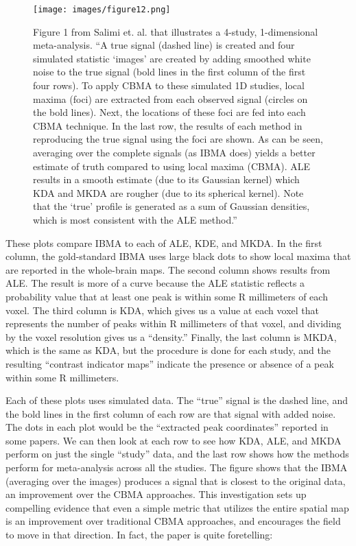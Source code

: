 \documentclass{report}
\begin{document}
\begin{figure}[h!]
\begin{center}
\texttt{[image: images/figure12.png]}
\end{center}
 \caption{\label{fig:12} Figure 1 from Salimi et. al. that illustrates a 4-study,
1-dimensional meta-analysis. ``A true signal (dashed line) is created
and four simulated statistic `images' are created by adding smoothed
white noise to the true signal (bold lines in the first column of the
first four rows). To apply CBMA to these simulated 1D studies, local
maxima (foci) are extracted from each observed signal (circles on the
bold lines). Next, the locations of these foci are fed into each CBMA
technique. In the last row, the results of each method in reproducing
the true signal using the foci are shown. As can be seen, averaging over
the complete signals (as IBMA does) yields a better estimate of truth
compared to using local maxima (CBMA). ALE results in a smooth estimate
(due to its Gaussian kernel) which KDA and MKDA are rougher (due to its
spherical kernel). Note that the `true' profile is generated as a sum of
Gaussian densities, which is most consistent with the ALE method.''}
\end{figure}

These plots \cite{Salimi-Khorshidi2009-if} compare
IBMA to each of ALE, KDE, and MKDA. In the first column, the
gold-standard IBMA uses large black dots to show local maxima that are
reported in the whole-brain maps. The second column shows results from
ALE. The result is more of a curve because the ALE statistic reflects a
probability value that at least one peak is within some R millimeters of
each voxel. The third column is KDA, which gives us a value at each
voxel that represents the number of peaks within R millimeters of that
voxel, and dividing by the voxel resolution gives us a ``density.''
Finally, the last column is MKDA, which is the same as KDA, but the
procedure is done for each study, and the resulting ``contrast indicator
maps'' indicate the presence or absence of a peak within some R
millimeters.

Each of these plots uses simulated data. The ``true'' signal is the
dashed line, and the bold lines in the first column of each row are that
signal with added noise. The dots in each plot would be the ``extracted
peak coordinates'' reported in some papers. We can then look at each row
to see how KDA, ALE, and MKDA perform on just the single ``study'' data,
and the last row shows how the methods perform for meta-analysis across
all the studies. The figure shows that the IBMA (averaging over the
images) produces a signal that is closest to the original data, an
improvement over the CBMA approaches. This investigation sets up
compelling evidence that even a simple metric that utilizes the entire
spatial map is an improvement over traditional CBMA approaches, and
encourages the field to move in that direction. In fact, the paper is
quite foretelling:
\end{document}
